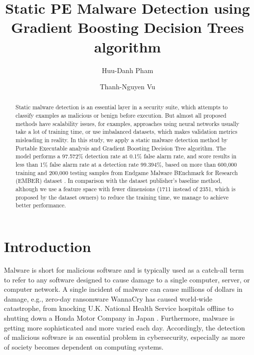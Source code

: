 \documentclass[runningheads]{llncs}
\begin{document}
\title{Static PE Malware Detection using Gradient Boosting Decision Trees algorithm}

\author{Huu-Danh Pham \and Thanh-Nguyen Vu}

%
\maketitle              %
%

\begin{abstract}
Static malware detection is an essential layer in a security suite, which attempts to classify examples as malicious or benign before execution. But almost all proposed methods have scalability issues, for examples, approaches using neural networks usually take a lot of training time, or use imbalanced datasets, which makes validation metrics misleading in reality.  In this study, we apply a static malware detection method by Portable Executable analysis and Gradient Boosting Decision Tree algorithm.  The model performs a 97.572\% detection rate at 0.1\% false alarm rate, and score results in less than 1\% false alarm rate at a detection rate 99.394\%, based on more than 600,000 training and 200,000 testing samples from Endgame Malware BEnchmark for Research (EMBER) dataset \cite{anderson2018ember}. In comparison with the dataset publisher's baseline method, although we use a feature space with fewer dimensions (1711 instead of 2351, which is proposed by the dataset owners) to reduce the training time, we manage to achieve better performance.

\end{abstract}
%
%
%
\section{Introduction}

Malware is short for malicious software and is typically used as a catch-all term to refer to any software designed to cause damage to a single computer, server, or computer network.  A single incident of malware can cause millions of dollars in damage, e.g., zero-day ransomware WannaCry has caused world-wide catastrophe, from knocking U.K. National Health Service hospitals offline to shutting down a Honda Motor Company in Japan \cite{chen2017automated}. Furthermore, malware is getting more sophisticated and more varied each day. Accordingly, the detection of malicious software is an essential problem in cybersecurity, especially as more of society becomes dependent on computing systems.
\end{document}
